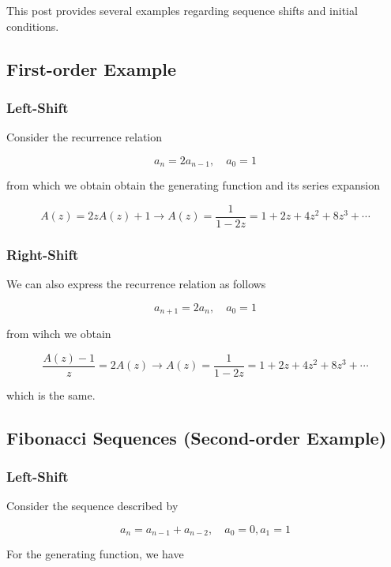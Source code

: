 
This post provides several examples regarding sequence shifts and initial conditions.

\subsection{First-order Example}\label{first-order-example}

\subsubsection{Left-Shift}\label{left-shift}

Consider the recurrence relation

\[a_{n} = 2a_{n-1}, \quad a_0 = 1\]

from which we obtain obtain the generating function and its series expansion

\[ A(z) = 2zA(z) + 1 \rightarrow A(z) = \frac{1}{1-2z} = 1 + 2z + 4z^2 + 8z^3 + \cdots\]

\subsubsection{Right-Shift}\label{right-shift}

We can also express the recurrence relation as follows

\[a_{n+1} = 2a_n, \quad a_0 = 1\]

from wihch we obtain

\[ \frac{A(z) - 1}{z} = 2A(z) \rightarrow A(z) = \frac{1}{1-2z} = 1 + 2z + 4z^2 + 8z^3 + \cdots\]

which is the same.

\subsection{Fibonacci Sequences (Second-order
Example)}\label{fibonacci-sequences-second-order-example}

\subsubsection{Left-Shift}\label{left-shift-1}

Consider the sequence described by

\[ a_n = a_{n-1} + a_{n-2}, \quad a_0 = 0, a_1 = 1 \]

For the generating function, we have

